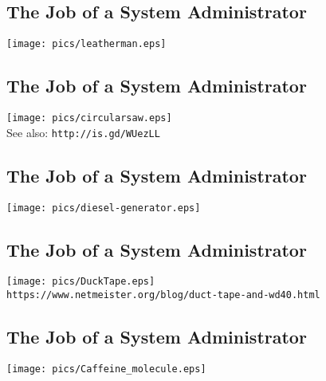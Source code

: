 \documentclass[xga]{xdvislides}
\begin{document}
\subsection{The Job of a System Administrator}
\vspace*{\fill}
\begin{center}
	\texttt{[image: pics/leatherman.eps]} \\
\end{center}
\vspace*{\fill}

\subsection{The Job of a System Administrator}
\vspace*{\fill}
\begin{center}
	\texttt{[image: pics/circularsaw.eps]} \\
	\small See also: {\tt http://is.gd/WUezLL} \Normalsize
\end{center}
\vspace*{\fill}

\subsection{The Job of a System Administrator}
\vspace*{\fill}
\begin{center}
	\texttt{[image: pics/diesel-generator.eps]} \\
\end{center}
\vspace*{\fill}

\subsection{The Job of a System Administrator}
\vspace*{\fill}
\begin{center}
	\texttt{[image: pics/DuckTape.eps]} \\
	\vspace{.5in}
	\small
	\verb+https://www.netmeister.org/blog/duct-tape-and-wd40.html+
	\Normalsize
\end{center}
\vspace*{\fill}

\subsection{The Job of a System Administrator}
\vspace*{\fill}
\begin{center}
	\texttt{[image: pics/Caffeine\_molecule.eps]} \\
\end{center}
\vspace*{\fill}
\end{document}
